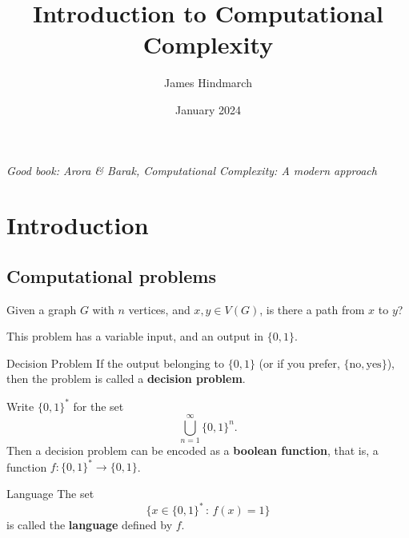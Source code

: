 \documentclass{article}
\title{Introduction to Computational Complexity}
\author{James Hindmarch}
\date{January 2024}
\begin{document}
\maketitle

\textit{Good book: Arora \& Barak, Computational Complexity: A modern approach}
\tableofcontents

\newpage
\newlec
\section{Introduction}
\subsection{Computational problems}
\begin{ex}
    Given a graph $G$ with $n$ vertices, and $x,y \in V(G)$, is there a path from $x$ to $y$?
\end{ex}
This problem has a variable input, and an output in $\{0,1\}$.
\begin{fancydefine}{Decision Problem}
    If the output belonging to $\{0,1\}$ (or if you prefer, $\{\text{no}, \text{yes} \}$), then the problem is called a \textbf{decision problem}.
\end{fancydefine}
Write $\{0,1\}^{*}$ for the set \[ 
    \bigcup_{n=1}^{\infty} \{0,1\}^{n}.
    \]
Then a decision problem can be encoded as a \textbf{boolean function}, that is, a function $f: \{0,1\}^{*} \to \{0,1\}$.

\begin{fancydefine}{Language}
    The set \[ \{ x \in \{0,1\}^{*} \, : \, f(x)=1\} \] is called the \textbf{language} defined by $f$.
\end{fancydefine}
\end{document}
